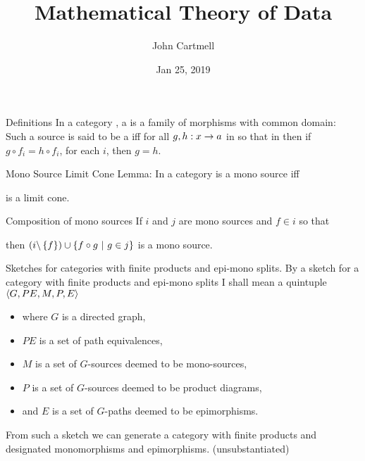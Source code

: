 \documentclass[xcolor=pst,dvips]{beamer}
\title[John Cartmell]{Mathematical Theory of Data}
\author{John Cartmell}
\institute{ad otium}
\date{Jan 25, 2019}
\begin{document}
\section{\MToDsection}
\subsection{\MToDsubsectionliteraturewithProductsandEpiMonosCategories}

\begin{frame}{Definitions} 
In a category \catc, a   is a family of morphisms with common domain: \\
\medskip
Such a source is said to be a   iff for all $g,h:x \rightarrow a$ in \catcw 
so that  
in \catcw then if $g \circ f_i = h \circ f_i$, for each $i$,  then $g=h$.
\end{frame}

\begin{frame}{Mono Source Limit Cone}  %
Lemma: In a category 
\scalebox{0.65}{

} is a mono source iff \\
\begin{center}
\scalebox{0.65}{

} 
is a limit cone.
\end{center}
\end{frame}

\begin{frame}{Composition of mono sources}
If $i$ and $j$ are mono sources and $f \in i$ so that
\begin{center}
\scalebox{0.65}{

}
\end{center}
then $(i \backslash \left\{f\right\}) \cup \left\{f \circ g \ \middle|\ g \in j\right\}$ is a mono source.
\end{frame}

\begin{frame}{Sketches for categories with finite products and epi-mono splits.}
By a sketch for a category with finite products and epi-mono splits I shall mean a quintuple
$\langle G,PE,M,P,E\rangle$
\begin{itemize}
\item  where $G$ is a directed graph, 
\item  $PE$ is a set of path equivalences, 
\item  $M$ is a set of $G$-sources deemed to be mono-sources,
\item  $P$ is a set of $G$-sources deemed to be product diagrams, 
\item  and $E$ is a set of $G$-paths deemed to be epimorphisms.
\end{itemize}
\medskip
From such a sketch we can generate a category with finite products and designated monomorphisms and epimorphisms.  \pause (unsubstantiated)   
\end{frame}
\end{document}
